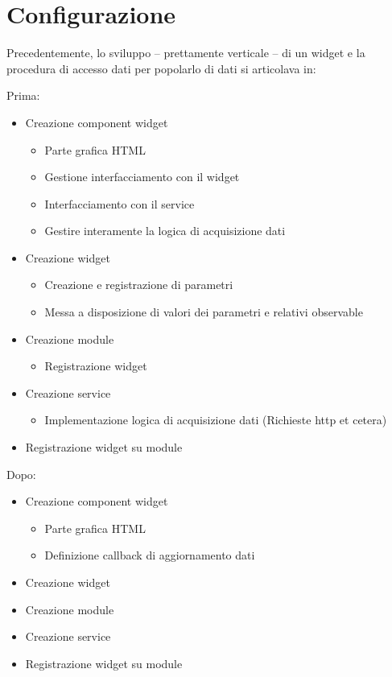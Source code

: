 \section{Configurazione}
Precedentemente, lo sviluppo -- prettamente verticale -- di un widget e la procedura di accesso dati per popolarlo di dati si articolava in:

\begin{multicols}{2}
Prima:
\begin{itemize}
\item
Creazione component widget
\begin{itemize}
\item
Parte grafica HTML
\item
Gestione interfacciamento con il widget
\item
Interfacciamento con il service
\item
Gestire interamente la logica di acquisizione dati
\end{itemize}
\item
Creazione widget
\begin{itemize}
\item
Creazione e registrazione di parametri
\item
Messa a disposizione di valori dei parametri e relativi observable
\end{itemize}
\item
Creazione module
\begin{itemize}
\item
Registrazione widget
\end{itemize}
\item
Creazione service
\begin{itemize}
\item
Implementazione logica di acquisizione dati (Richieste http et cetera)
\end{itemize}
\item
Registrazione widget su module
\end{itemize}
\columnbreak

Dopo:
\begin{itemize}
\item
Creazione component widget
\begin{itemize}
\item
Parte grafica HTML
\item
Definizione callback di aggiornamento dati
\end{itemize}
\item
Creazione widget
\item
Creazione module
\item
Creazione service
\item
Registrazione widget su module
\end{itemize}

\end{multicols}

